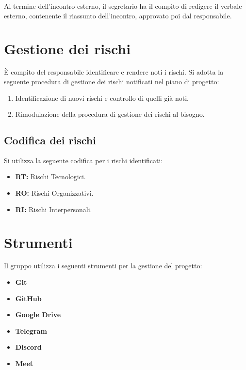 Al termine dell'incontro esterno, il segretario ha il compito di redigere il verbale esterno, contenente il riassunto dell'incontro, approvato poi dal responsabile.

\section{Gestione dei rischi}

È compito del responsabile identificare e rendere noti i rischi. Si adotta la seguente procedura di gestione dei rischi notificati nel piano di progetto:

\begin{enumerate}
\item Identificazione di nuovi rischi e controllo di quelli già noti.
\item Rimodulazione della procedura di gestione dei rischi al bisogno.
\end{enumerate}

\subsection{Codifica dei rischi}

Si utilizza la seguente codifica per i rischi identificati:

\begin{itemize}
\item \textbf{RT:} Rischi Tecnologici.
\item \textbf{RO:} Rischi Organizzativi.
\item \textbf{RI:} Rischi Interpersonali.
\end{itemize}

\section{Strumenti}

Il gruppo utilizza i seguenti strumenti per la gestione del progetto:

\begin{itemize}
\item \textbf{Git}
\item \textbf{GitHub}
\item \textbf{Google Drive}
\item \textbf{Telegram}
\item \textbf{Discord}
\item \textbf{Meet}
\end{itemize}